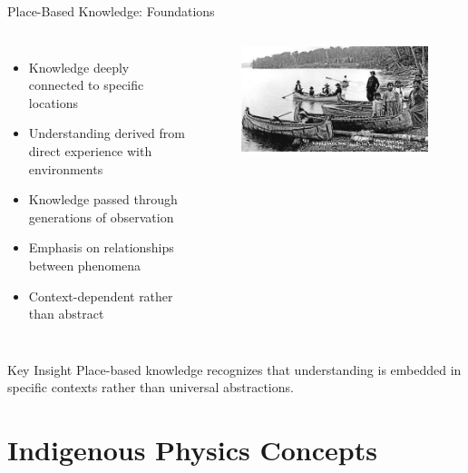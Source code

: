 \documentclass{beamer}
\begin{document}
\begin{frame}{Place-Based Knowledge: Foundations}
    \begin{columns}
        \begin{itemize}
            \item Knowledge deeply connected to specific locations
            \item Understanding derived from direct experience with environments
            \item Knowledge passed through generations of observation
            \item Emphasis on relationships between phenomena
            \item Context-dependent rather than abstract
        \end{itemize}
        
        \begin{figure}
            \centering
            \includegraphics[width=0.75\linewidth]{cs12-history-indigenous-people-canoes.jpg}
        \end{figure}
    \end{columns}
    
    \begin{alertblock}{Key Insight}
        Place-based knowledge recognizes that understanding is embedded in specific contexts rather than universal abstractions.
    \end{alertblock}
\end{frame}

\section{Indigenous Physics Concepts}
\end{document}
